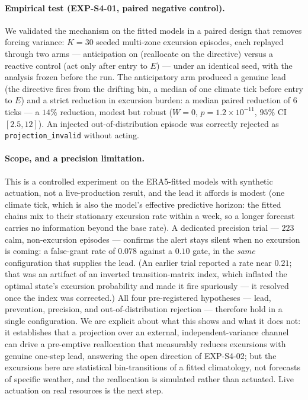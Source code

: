 \documentclass[11pt, a4paper]{article}
\begin{document}
\paragraph{Empirical test (EXP-S4-01, paired negative control).} We validated the mechanism on the
fitted models in a paired design that removes forcing variance: $K = 30$ seeded multi-zone
excursion episodes, each replayed through two arms --- anticipation on (reallocate on the
directive) versus a reactive control (act only after entry to $E$) --- under an identical seed, with
the analysis frozen before the run. The anticipatory arm produced a genuine lead (the directive
fires from the drifting bin, a median of one climate tick before entry to $E$) and a strict
reduction in excursion burden: a median paired reduction of $6$ ticks --- a $14\%$ reduction,
modest but robust ($W = 0$, $p = 1.2\times 10^{-11}$, $95\%$ CI $[2.5, 12]$). An injected
out-of-distribution episode was correctly rejected as \texttt{projection\_invalid} without acting.

\paragraph{Scope, and a precision limitation.} This is a controlled experiment on the ERA5-fitted
models with synthetic actuation, not a live-production result, and the lead it affords is modest
(one climate tick, which is also the model's effective predictive horizon: the fitted chains mix
to their stationary excursion rate within a week, so a longer forecast carries no information
beyond the base rate). A dedicated precision trial --- $223$ calm, non-excursion episodes ---
confirms the alert stays silent when no excursion is coming: a false-grant rate of $0.078$ against a
$0.10$ gate, in the \emph{same} configuration that supplies the lead. (An earlier trial reported a
rate near $0.21$; that was an artifact of an inverted transition-matrix index, which inflated the
optimal state's excursion probability and made it fire spuriously --- it resolved once the index
was corrected.) All four pre-registered hypotheses --- lead, prevention, precision, and
out-of-distribution rejection --- therefore hold in a single configuration. We are explicit about
what this shows and what it does not: it establishes that a projection over an external,
independent-variance channel can drive a pre-emptive reallocation that measurably reduces excursions
with genuine one-step lead, answering the open direction of EXP-S4-02; but the excursions here are
statistical bin-transitions of a fitted climatology, not forecasts of specific weather, and the
reallocation is simulated rather than actuated. Live actuation on real resources is the next step.
\end{document}
